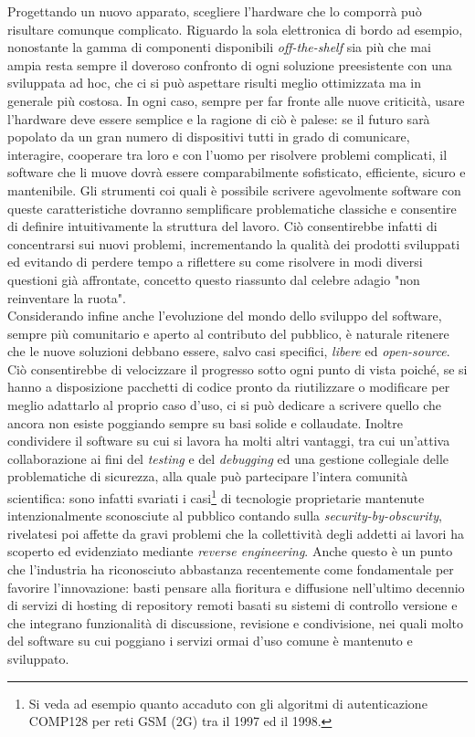 Progettando un nuovo apparato, scegliere l'hardware che lo comporrà può risultare comunque complicato. Riguardo la sola elettronica di bordo ad esempio, nonostante la gamma di componenti disponibili \emph{off-the-shelf} sia più che mai ampia resta sempre il doveroso confronto di ogni soluzione preesistente con una sviluppata ad hoc, che ci si può aspettare risulti meglio ottimizzata ma in generale più costosa. In ogni caso, sempre per far fronte alle nuove criticità, usare l'hardware deve essere semplice e la ragione di ciò è palese: se il futuro sarà popolato da un gran numero di dispositivi tutti in grado di comunicare, interagire, cooperare tra loro e con l'uomo per risolvere problemi complicati, il software che li muove dovrà essere comparabilmente sofisticato, efficiente, sicuro e mantenibile. Gli strumenti coi quali è possibile scrivere agevolmente software con queste caratteristiche dovranno semplificare problematiche classiche e consentire di definire intuitivamente la struttura del lavoro. Ciò consentirebbe infatti di concentrarsi sui nuovi problemi, incrementando la qualità dei prodotti sviluppati ed evitando di perdere tempo a riflettere su come risolvere in modi diversi questioni già affrontate, concetto questo riassunto dal celebre adagio "non reinventare la ruota".\\
Considerando infine anche l'evoluzione del mondo dello sviluppo del software, sempre più comunitario e aperto al contributo del pubblico, è naturale ritenere che le nuove soluzioni debbano essere, salvo casi specifici, \emph{libere} ed \emph{open-source}. Ciò consentirebbe di velocizzare il progresso sotto ogni punto di vista poiché, se si hanno a disposizione pacchetti di codice pronto da riutilizzare o modificare per meglio adattarlo al proprio caso d'uso, ci si può dedicare a scrivere quello che ancora non esiste poggiando sempre su basi solide e collaudate. Inoltre condividere il software su cui si lavora ha molti altri vantaggi, tra cui un'attiva collaborazione ai fini del \emph{testing} e del \emph{debugging} ed una gestione collegiale delle problematiche di sicurezza, alla quale può partecipare l'intera comunità scientifica: sono infatti svariati i casi\footnote{Si veda ad esempio quanto accaduto con gli algoritmi di autenticazione COMP128 per reti GSM (2G) tra il 1997 ed il 1998.} di tecnologie proprietarie mantenute intenzionalmente sconosciute al pubblico contando sulla \emph{security-by-obscurity}, rivelatesi poi affette da gravi problemi che la collettività degli addetti ai lavori ha scoperto ed evidenziato mediante \emph{reverse engineering}. Anche questo è un punto che l'industria ha riconosciuto abbastanza recentemente come fondamentale per favorire l'innovazione: basti pensare alla fioritura e diffusione nell'ultimo decennio di servizi di hosting di repository remoti basati su sistemi di controllo versione e che integrano funzionalità di discussione, revisione e condivisione, nei quali molto del software su cui poggiano i servizi ormai d'uso comune è mantenuto e sviluppato.\\
